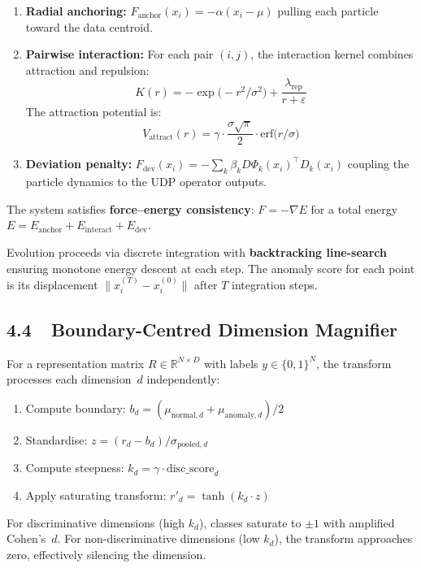 \documentclass[12pt,a4paper]{article}
\begin{document}
\begin{enumerate}
\item \textbf{Radial anchoring:} $F_{\mathrm{anchor}}(x_i) = -\alpha(x_i - \mu)$
  pulling each particle toward the data centroid.

\item \textbf{Pairwise interaction:} For each pair $(i,j)$, the interaction
  kernel combines attraction and repulsion:
  \[
    K(r) = -\exp\!\bigl(-r^2/\sigma^2\bigr) + \frac{\lambda_{\mathrm{rep}}}{r + \varepsilon}
  \]
  The attraction potential is:
  \[
    V_{\mathrm{attract}}(r) = \gamma \cdot \frac{\sigma\sqrt{\pi}}{2}
    \cdot \mathrm{erf}\!\bigl(r/\sigma\bigr)
  \]

\item \textbf{Deviation penalty:} $F_{\mathrm{dev}}(x_i)
  = -\sum_k \beta_k D\Phi_k(x_i)^\top D_k(x_i)$ coupling the particle
  dynamics to the UDP operator outputs.
\end{enumerate}

The system satisfies \textbf{force--energy consistency}: $F = -\nabla E$ for
a total energy $E = E_{\mathrm{anchor}} + E_{\mathrm{interact}} + E_{\mathrm{dev}}$.

Evolution proceeds via discrete integration with \textbf{backtracking
line-search} ensuring monotone energy descent at each step.  The anomaly score
for each point is its displacement $\|x_i^{(T)} - x_i^{(0)}\|$ after $T$
integration steps.

\subsection{4.4~~Boundary-Centred Dimension Magnifier}

For a representation matrix $R \in \mathbb{R}^{N \times D}$ with labels
$y \in \{0,1\}^N$, the transform processes each dimension~$d$ independently:

\begin{enumerate}
\item Compute boundary: $b_d = (\mu_{\mathrm{normal},d} + \mu_{\mathrm{anomaly},d})/2$
\item Standardise: $z = (r_d - b_d) / \sigma_{\mathrm{pooled},d}$
\item Compute steepness: $k_d = \gamma \cdot \mathrm{disc\_score}_d$
\item Apply saturating transform: $r'_d = \tanh(k_d \cdot z)$
\end{enumerate}

For discriminative dimensions (high $k_d$), classes saturate to $\pm 1$ with
amplified Cohen's~$d$.  For non-discriminative dimensions (low $k_d$), the
transform approaches zero, effectively silencing the dimension.
\end{document}
